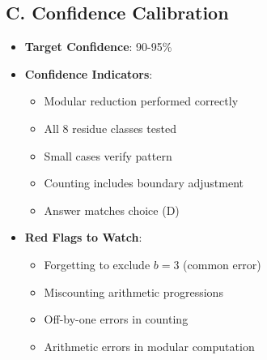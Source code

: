 \documentclass[11pt]{article}
\begin{document}
\begin{verificationbox}
\subsection*{C. Confidence Calibration}
\begin{itemize}[leftmargin=*]
    \item \textbf{Target Confidence}: 90-95\%
    \item \textbf{Confidence Indicators}:
    \begin{itemize}
        \item[$\checkmark$] Modular reduction performed correctly
        \item[$\checkmark$] All 8 residue classes tested
        \item[$\checkmark$] Small cases verify pattern
        \item[$\checkmark$] Counting includes boundary adjustment
        \item[$\checkmark$] Answer matches choice (D)
    \end{itemize}
    \item \textbf{Red Flags to Watch}:
    \begin{itemize}
        \item Forgetting to exclude $b = 3$ (common error)
        \item Miscounting arithmetic progressions
        \item Off-by-one errors in counting
        \item Arithmetic errors in modular computation
    \end{itemize}
\end{itemize}
\end{verificationbox}
\end{document}
